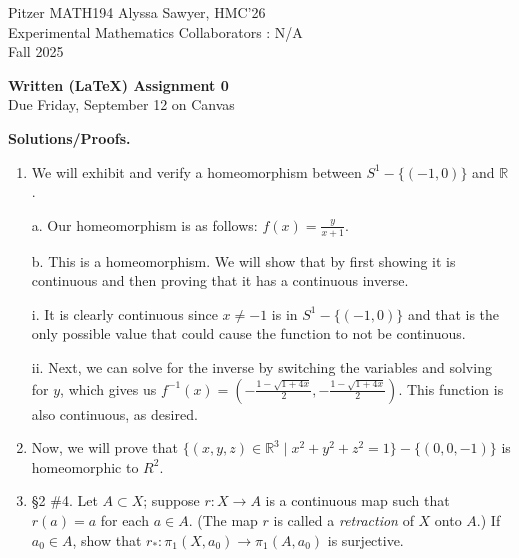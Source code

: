 \documentclass[12pt]{article}
\begin{document}
Pitzer MATH194 \hfill Alyssa Sawyer, HMC'26 %
\\
Experimental Mathematics \hfill  Collaborators : N/A \\
Fall 2025
\begin{center}
{\large \bf Written (LaTeX) Assignment 0}\\
Due Friday, September 12 on Canvas
\end{center}

{\bf Solutions/Proofs.}
\begin{enumerate}

\item
We will exhibit and verify a homeomorphism between $S^1 - \{(-1,0)\}$ and $\mathbb{R}$. 

a. Our homeomorphism is as follows: $f(x) = \frac{y}{x+1}$.

b. This is a homeomorphism. We will show that by first showing it is continuous and then proving that it has a continuous inverse.

i. It is clearly continuous since $x \neq -1$ is in $S^1 - \{(-1,0)\}$ and that is the only possible value that could cause the function to not be continuous. 

ii. Next, we can solve for the inverse by switching the variables and solving for $y$, which gives us $f^{-1}(x) = (-\frac{1-\sqrt{1+4x}}{2}, -\frac{1-\sqrt{1+4x}}{2})$. This function is also continuous, as desired.   


\item Now, we will prove that $\{(x,y,z) \in \mathbb{R}^3 \mid x^2 + y^2 + z^2 = 1\}- \{(0,0,-1)\}$ is homeomorphic to $R^2$.



\item \S2 \#4.
Let $A\subset X$; suppose $r\colon X\to A$ is a continuous map such that $r(a)=a$ for each $a\in A$.
(The map $r$ is called a \emph{retraction} of $X$ onto $A$.)
If $a_0\in A$, show that $r_*\colon \pi_1(X,a_0) \to \pi_1(A,a_0)$ is surjective.




\end{enumerate}
\end{document}
